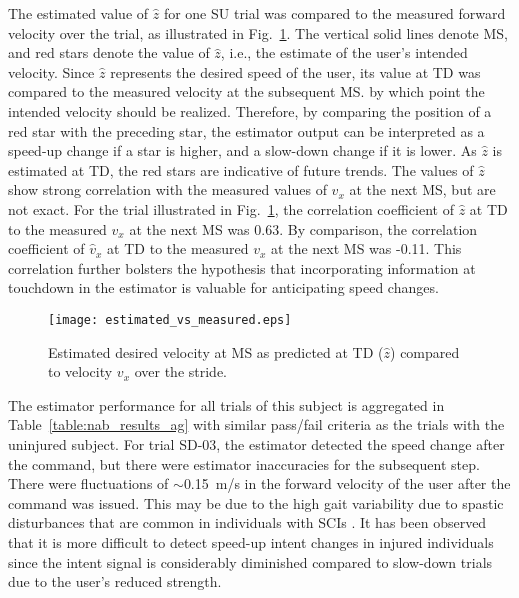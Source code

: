 The estimated value of $ \hat{z} $ for one SU trial was compared to the measured forward velocity over the trial, as illustrated in Fig.~\ref{fig:m_v_e}. The vertical solid lines denote MS, and red stars denote the value of $ \hat{z} $, i.e., the estimate of the user's intended velocity. Since $\hat{z}$ represents the desired speed of the user, its value at TD was compared to the measured velocity at the subsequent MS. by which point the intended velocity should be realized. Therefore, by comparing the position of a red star with the preceding star, the estimator output can be interpreted as a speed-up change if a star is higher, and a slow-down change if it is lower. As $ \hat{z} $ is estimated at TD, the red stars are indicative of future trends. The values of $ \hat{z} $ show strong correlation with the measured values of $v_x$ at the next MS, but are not exact. For the trial illustrated in Fig.~\ref{fig:m_v_e}, the correlation coefficient of $ \hat{z} $ at TD to the measured $ v_x $ at the next MS was 0.63. By comparison, the correlation coefficient of $ \hat{v}_x $ at TD to the measured $ v_x $ at the next MS was -0.11. This correlation further bolsters the hypothesis that incorporating information at touchdown in the estimator is valuable for anticipating speed changes.

\begin{figure}
	\centering
	\texttt{[image: estimated\_vs\_measured.eps]}
	\caption{Estimated desired velocity at MS as predicted at TD ($\hat{z}$) compared to velocity $v_x$ over the stride.} \label{fig:m_v_e}
\end{figure}

The estimator performance for all trials of this subject is aggregated in Table~\ref{table:nab_results_ag} with similar pass/fail criteria as the trials with the uninjured subject. For trial SD-03, the estimator detected the speed change after the command, but there were estimator inaccuracies for the subsequent step. There were fluctuations of $ \sim $0.15~m/s in the forward velocity of the user after the command was issued. This may be due to the high gait variability due to spastic disturbances that are common in individuals with SCIs \cite{malhotra2009spasticity}. It has been observed that it is more difficult to detect speed-up intent changes in injured individuals since the intent signal is considerably diminished compared to slow-down trials \cite{gambon2020effects} due to the user's reduced strength.



